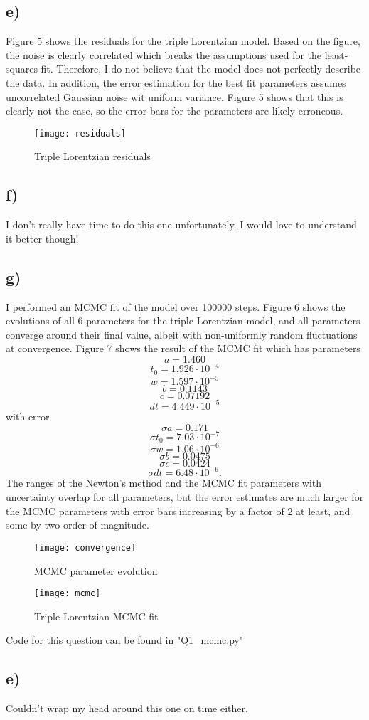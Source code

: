 \documentclass{article}
\newcommand{\<}[1]{\left\langle #1 \right\rangle }
\begin{document}
\subsection{e)}
Figure 5 shows the residuals for the triple Lorentzian model. Based on the figure, the noise is clearly correlated which breaks the assumptions used for the least-squares fit. Therefore, I do not believe that the model does not perfectly describe the data. In addition, the error estimation for the best fit parameters assumes uncorrelated Gaussian noise wit uniform variance. Figure 5 shows that this is clearly not the case, so the error bars for the parameters are likely erroneous.
\begin{figure}[h]
	\caption{Triple Lorentzian residuals}
	\centering{}
	\texttt{[image: residuals]}
\end{figure}

\subsection{f)}
I don't really have time to do this one unfortunately. I would love to understand it better though!

\subsection{g)}
I performed an MCMC fit of the model over 100000 steps. Figure 6 shows the evolutions of all 6 parameters for the triple Lorentzian model, and all parameters converge around their final value, albeit with non-uniformly random fluctuations at convergence. Figure 7 shows the result of the MCMC fit which has parameters 
\[ a = 1.460\]
\[ t_0 = 1.926\cdot 10^{-4}\]
\[ w = 1.597\cdot 10^{-5}\]
\[ b = 0.1143\]
\[ c = 0.07192\]
\[ dt = 4.449\cdot 10^{-5}\]
with error
\[ \sigma a = 0.171\]
\[ \sigma t_0 = 7.03\cdot 10^{-7}\]
\[ \sigma w = 1.06\cdot 10^{-6}\]
\[ \sigma b = 0.0475\]
\[ \sigma c = 0.0424\]
\[ \sigma dt = 6.48\cdot 10^{-6}.\]
The ranges of the Newton's method and the MCMC fit parameters with uncertainty overlap for all parameters, but the error estimates are much larger for the MCMC parameters with error bars increasing by a factor of 2 at least, and some by two order of magnitude.
\begin{figure}[h]
	\caption{MCMC parameter evolution}
	\centering
	\texttt{[image: convergence]}
\end{figure}

\begin{figure}[h]
	\caption{Triple Lorentzian MCMC fit}
	\centering
	\texttt{[image: mcmc]}
\end{figure}

Code for this question can be found in "Q1\_mcmc.py"

\subsection{e)}
Couldn't wrap my head around this one on time either.
\end{document}
